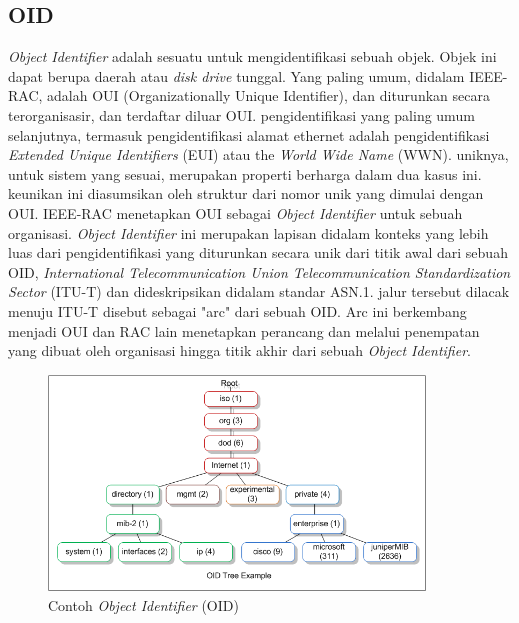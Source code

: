 		\subsection{OID}
			\textit{Object Identifier} adalah sesuatu untuk mengidentifikasi sebuah objek. Objek ini dapat berupa daerah atau \textit{disk drive} tunggal. Yang paling umum, didalam IEEE-RAC, adalah OUI (Organizationally Unique Identifier), dan diturunkan secara terorganisasir, dan terdaftar diluar OUI. pengidentifikasi yang paling umum selanjutnya, termasuk pengidentifikasi alamat ethernet adalah pengidentifikasi \textit{Extended Unique Identifiers} (EUI) atau the \textit{World Wide Name} (WWN). uniknya, untuk sistem yang sesuai, merupakan properti berharga dalam dua kasus ini. keunikan ini diasumsikan oleh struktur dari nomor unik yang dimulai dengan OUI. IEEE-RAC menetapkan OUI sebagai \textit{Object Identifier} untuk sebuah organisasi. \textit{Object Identifier} ini merupakan lapisan didalam konteks yang lebih luas dari pengidentifikasi yang diturunkan secara unik dari titik awal dari sebuah OID, \textit{International
			Telecommunication Union Telecommunication Standardization Sector} (ITU-T) dan dideskripsikan didalam standar ASN.1. jalur tersebut dilacak menuju ITU-T disebut sebagai "arc" dari sebuah OID. Arc ini berkembang menjadi OUI dan RAC lain menetapkan perancang dan melalui penempatan yang dibuat oleh organisasi hingga titik akhir dari sebuah \textit{Object Identifier}.
			\begin{figure}[H]
				\centering
				\includegraphics[width=10cm]{Images/C-2/OID.png}
				\caption{Contoh \textit{Object Identifier} (OID)}
				\label{oidexample}
			\end{figure}
